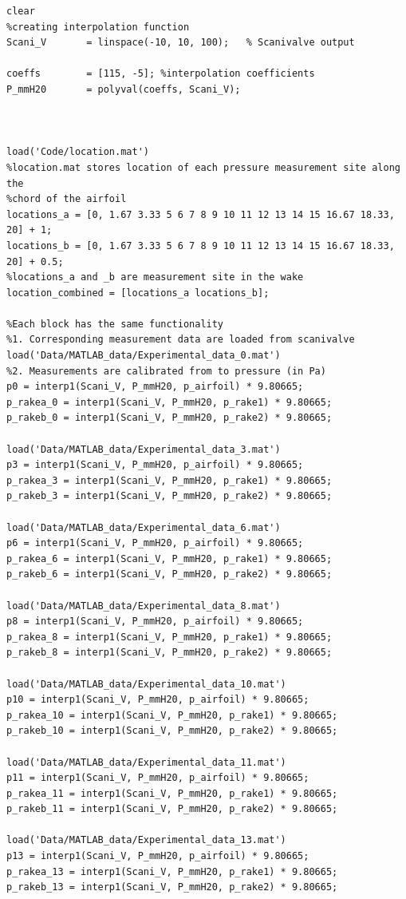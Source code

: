 \documentclass[runningheads]{llncs}
\begin{document}
\begin{verbatim}
clear
%creating interpolation function
Scani_V       = linspace(-10, 10, 100);   % Scanivalve output 

coeffs        = [115, -5]; %interpolation coefficients              
P_mmH20       = polyval(coeffs, Scani_V); 



load('Code/location.mat')
%location.mat stores location of each pressure measurement site along the
%chord of the airfoil
locations_a = [0, 1.67 3.33 5 6 7 8 9 10 11 12 13 14 15 16.67 18.33, 20] + 1;
locations_b = [0, 1.67 3.33 5 6 7 8 9 10 11 12 13 14 15 16.67 18.33, 20] + 0.5;
%locations_a and _b are measurement site in the wake
location_combined = [locations_a locations_b];

%Each block has the same functionality
%1. Corresponding measurement data are loaded from scanivalve
load('Data/MATLAB_data/Experimental_data_0.mat')
%2. Measurements are calibrated from to pressure (in Pa)
p0 = interp1(Scani_V, P_mmH20, p_airfoil) * 9.80665;
p_rakea_0 = interp1(Scani_V, P_mmH20, p_rake1) * 9.80665;
p_rakeb_0 = interp1(Scani_V, P_mmH20, p_rake2) * 9.80665;

load('Data/MATLAB_data/Experimental_data_3.mat')
p3 = interp1(Scani_V, P_mmH20, p_airfoil) * 9.80665;
p_rakea_3 = interp1(Scani_V, P_mmH20, p_rake1) * 9.80665;
p_rakeb_3 = interp1(Scani_V, P_mmH20, p_rake2) * 9.80665;

load('Data/MATLAB_data/Experimental_data_6.mat')
p6 = interp1(Scani_V, P_mmH20, p_airfoil) * 9.80665;
p_rakea_6 = interp1(Scani_V, P_mmH20, p_rake1) * 9.80665;
p_rakeb_6 = interp1(Scani_V, P_mmH20, p_rake2) * 9.80665;

load('Data/MATLAB_data/Experimental_data_8.mat')
p8 = interp1(Scani_V, P_mmH20, p_airfoil) * 9.80665;
p_rakea_8 = interp1(Scani_V, P_mmH20, p_rake1) * 9.80665;
p_rakeb_8 = interp1(Scani_V, P_mmH20, p_rake2) * 9.80665;

load('Data/MATLAB_data/Experimental_data_10.mat')
p10 = interp1(Scani_V, P_mmH20, p_airfoil) * 9.80665;
p_rakea_10 = interp1(Scani_V, P_mmH20, p_rake1) * 9.80665;
p_rakeb_10 = interp1(Scani_V, P_mmH20, p_rake2) * 9.80665;

load('Data/MATLAB_data/Experimental_data_11.mat')
p11 = interp1(Scani_V, P_mmH20, p_airfoil) * 9.80665;
p_rakea_11 = interp1(Scani_V, P_mmH20, p_rake1) * 9.80665;
p_rakeb_11 = interp1(Scani_V, P_mmH20, p_rake2) * 9.80665;

load('Data/MATLAB_data/Experimental_data_13.mat')
p13 = interp1(Scani_V, P_mmH20, p_airfoil) * 9.80665;
p_rakea_13 = interp1(Scani_V, P_mmH20, p_rake1) * 9.80665;
p_rakeb_13 = interp1(Scani_V, P_mmH20, p_rake2) * 9.80665;


\end{verbatim}
\end{document}
